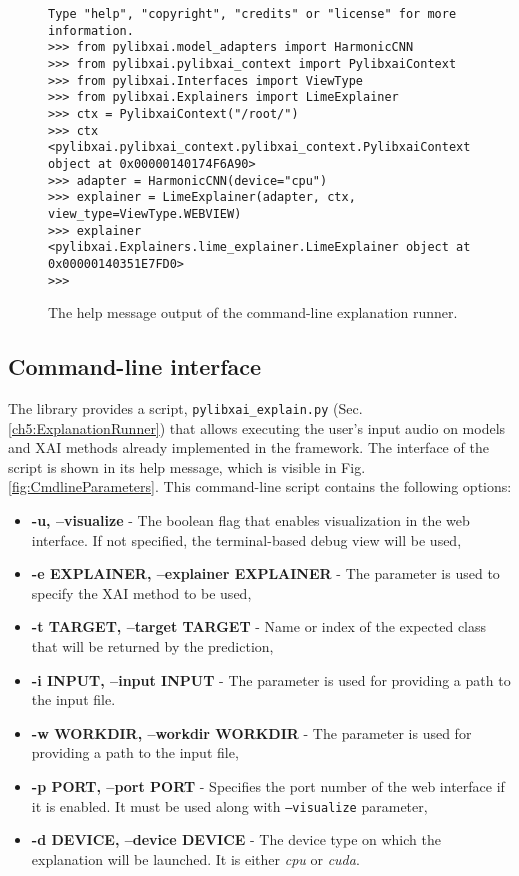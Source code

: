 \documentclass[
    bindingoffset=5mm,  %
    footnoteindent=3mm, %
    hyphenation=true    %
]{src/wut-thesis}
\begin{document}
\begin{figure}%
\begin{verbatim}
Type "help", "copyright", "credits" or "license" for more information.
>>> from pylibxai.model_adapters import HarmonicCNN
>>> from pylibxai.pylibxai_context import PylibxaiContext
>>> from pylibxai.Interfaces import ViewType
>>> from pylibxai.Explainers import LimeExplainer
>>> ctx = PylibxaiContext("/root/")
>>> ctx
<pylibxai.pylibxai_context.pylibxai_context.PylibxaiContext object at 0x00000140174F6A90>
>>> adapter = HarmonicCNN(device="cpu")
>>> explainer = LimeExplainer(adapter, ctx, view_type=ViewType.WEBVIEW)
>>> explainer
<pylibxai.Explainers.lime_explainer.LimeExplainer object at 0x00000140351E7FD0>
>>>
\end{verbatim}
\caption{The help message output of the command-line explanation runner.}
\label{fig:ApiUsage}
\end{figure}

\subsection{Command-line interface} \label{ch4:CmdTool}

The library provides a script, \texttt{pylibxai\_explain.py} (Sec. \ref{ch5:ExplanationRunner})
that allows executing the user’s input audio on models and XAI methods
already implemented in the framework. The interface of the script is shown
in its help message, which is visible in Fig. \ref{fig:CmdlineParameters}.
This command-line script contains the following options:
\begin{itemize}
    \item \textbf{-u, --visualize} - The boolean flag that enables visualization in the web interface.
        If not specified, the terminal-based debug view will be used,
    \item \textbf{-e EXPLAINER, --explainer EXPLAINER} - The parameter is used to specify
        the XAI method to be used,
    \item \textbf{-t TARGET, --target TARGET} - Name or index of the expected class that will be returned
        by the prediction,
    \item \textbf{-i INPUT, --input INPUT} - The parameter is used for providing a path to the input file.
    \item \textbf{-w WORKDIR, --workdir WORKDIR} - The parameter is used for providing a path to the input file,
    \item \textbf{-p PORT, --port PORT} - Specifies the port number of the web interface if it is enabled.
        It must be used along with \texttt{--visualize} parameter,
    \item \textbf{-d DEVICE, --device DEVICE} - The device type on which the explanation will be launched.
        It is either \emph{cpu} or \emph{cuda}.
\end{itemize}
\end{document}

